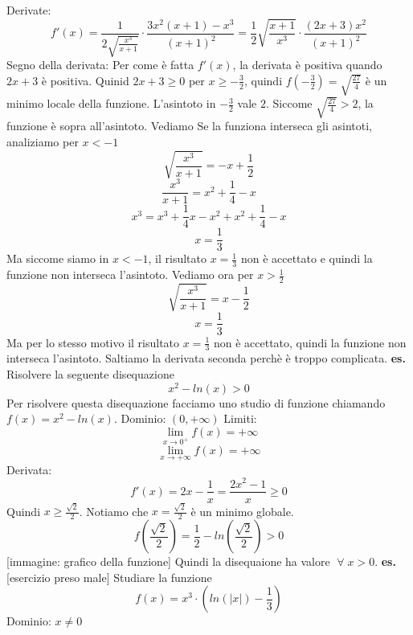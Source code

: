 Derivate:
\[
    f'(x) = \frac{1}{2 \sqrt{\frac{x^3}{x+1}}} \cdot \frac{3x^2 (x+1) -x ^3}{(x+1)^2} = \frac{1}{2}\sqrt{\frac{x+1}{x^3}} \cdot \frac{(2x+3)x^2}{(x+1)^2}
\]
Segno della derivata: Per come è fatta $f'(x)$, la derivata è positiva quando $2x+3$ è positiva. Quinid $ 2x+3 \geq 0$ per $x \geq -\frac{3}{2}$, quindi $f(-\frac{3}{2}) = \sqrt{\frac{27}{4}}$ è un minimo locale della funzione. L'asintoto in $-\frac{3}{2}$ vale $2$. Siccome $\sqrt{\frac{27}{4}} > 2$, la funzione è sopra all'asintoto.\newline
Vediamo Se la funziona interseca gli asintoti, analiziamo per $x<-1$
\[
    \sqrt{\frac{x^3}{x+1}} = -x +\frac{1}{2}
\]
\[
    \frac{x^3}{x+1} = x^2 + \frac{1}{4} - x
\]
\[
    x^3 = x^3 + \frac{1}{4}x -x^2 + x^2 +\frac{1}{4} -x
\]
\[
    x=\frac{1}{3}
\]
Ma siccome siamo in $x<-1$, il risultato $x= \frac{1}{3}$ non è accettato e quindi la funzione non interseca l'asintoto. Vediamo ora per $x > \frac{1}{2}$
\[
    \sqrt{\frac{x^3}{x+1}} = x - \frac{1}{2}
\]
\[
    x = \frac{1}{3}
\]
Ma per lo stesso motivo il risultato $x = \frac{1}{3}$ non è accettato, quindi la funzione non interseca l'asintoto. \newline
Saltiamo la derivata seconda perchè è troppo complicata.\newline
\newline
\newline
\textbf{es.}  Risolvere la seguente disequazione
\[
    x^2-ln(x) > 0
\]
Per risolvere questa disequazione facciamo uno studio di funzione chiamando $f(x) = x^2 -ln(x)$.\newline
Dominio: $(0, +\infty)$\newline
Limiti:
\[
    \lim_{x\rightarrow 0^+} f(x) = +\infty
\]
\[
    \lim_{x\rightarrow + \infty} f(x) = + \infty
\]
Derivata:
\[
    f'(x) = 2x - \frac{1}{x} = \frac{2x^2 -1 }{x} \geq 0
\]
Quindi $x \geq \frac{\sqrt{2}}{2}$. Notiamo che $x = \frac{\sqrt{2}}{2}$ è un minimo globale.\newline
\[
    f(\frac{\sqrt{2}}{2}) = \frac{1}{2} - ln (\frac{\sqrt{2}}{2}) > 0
\]
[immagine: grafico della funzione]\newline
Quindi la disequaione ha valore $\;\forall\;x >0$.\newline
\newline
\newline
\textbf{es.} [esercizio preso male] Studiare la funzione
\[
    f(x) = x^3 \cdot (ln(|x|) - \frac{1}{3})
\]
Dominio: $x\neq 0$\newline
